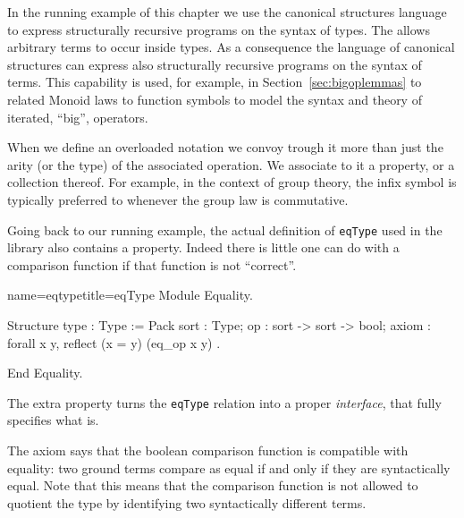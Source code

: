 
In the running example of this chapter we use the canonical structures
language to express structurally recursive programs on the syntax
of types.  The \mcbCIC{} allows arbitrary terms to occur inside
types.  As a consequence the language of canonical structures can
express also structurally recursive programs on the syntax
of terms.  This capability is used, for example, in
Section~\ref{sec:bigoplemmas} to related Monoid laws to function
symbols to model the syntax and theory of iterated, ``big'', operators.

\label{rec:itf}

When we define an overloaded notation we convoy
trough it more than just the arity (or the type) of the associated
operation.  We associate to it a property, or a collection thereof.
For example, in the context of group theory, the infix \C{+} symbol
is typically preferred to \C{*} whenever the group law is
commutative.

Going back to our running example, the actual definition of \lstinline/eqType/
used in the \mcbMC{} library also contains a property.
Indeed there is little one can do with a comparison function if that
function is not ``correct''.

\begin{coq}{name=eqtype}{title=eqType}
Module Equality.

Structure type : Type := Pack {
  sort : Type;
  op : sort -> sort -> bool;
  axiom : forall x y, reflect (x = y) (eq_op x y)
}.

End Equality.
\end{coq}

The extra property turns the
\lstinline/eqType/ relation into a proper \emph{interface},
that fully specifies what  is.

The axiom says that the boolean comparison function
is compatible with equality: two ground terms compare as equal if and
only if they are syntactically equal.  Note that this means that the
comparison function is not allowed to quotient the type by identifying
two syntactically different terms.

